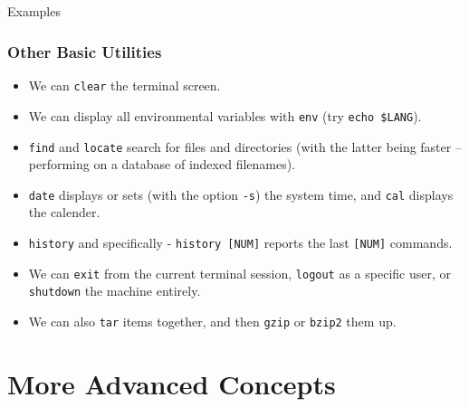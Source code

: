 \documentclass[10pt]{beamer}
\begin{document}
\subsection{}
\begin{frame}[fragile]{Examples}
\frametitle{Other Basic Utilities}
\begin{itemize}
\item We can \texttt{clear} the terminal screen.\vspace{0.1in}
\item We can display all environmental variables with \texttt{env} (try \texttt{echo \$LANG}).\vspace{0.1in}
\item \texttt{find} and \texttt{locate} search for files and directories (with the latter being faster -- performing on a database of indexed filenames).\vspace{0.1in}
\item  \texttt{date} displays or sets (with the option \texttt{-s}) the system time, and \texttt{cal} displays the calender.\vspace{0.1in}
\item \texttt{history} and specifically - \texttt{history [NUM]} reports the last \texttt{[NUM]} commands.\vspace{0.1in}
\item We can \texttt{exit} from the current terminal session, \texttt{logout} as a specific user, or \texttt{shutdown} the machine entirely.\vspace{0.1in}
\item We can also \texttt{tar} items together, and then \texttt{gzip} or \texttt{bzip2} them up.
\end{itemize}
\end{frame}

\section{More Advanced Concepts}
\end{document}

